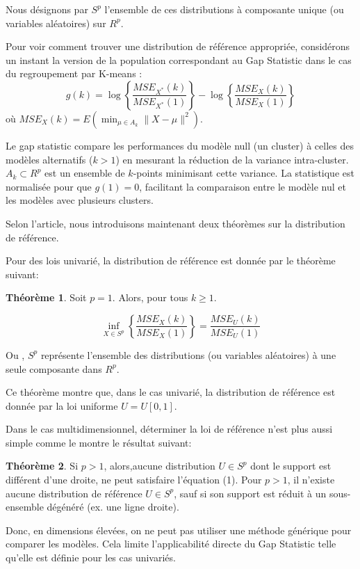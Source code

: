 Nous désignons par $S^{p}$ l'ensemble de ces distributions à composante unique (ou variables aléatoires) sur $R^{p}$.

Pour voir comment trouver une distribution de référence appropriée, considérons un instant la version de la population correspondant au Gap Statistic dans le cas du regroupement par K-means :
$$
g(k)=\log\left\{\frac{MSE_{X^{*}}(k)}{MSE_{X^{*}}(1)}\right\}-\log\left\{\frac{MSE_{X}(k)}{MSE_{X}(1)}\right\}
$$ où $MSE_{X}(k)=E(\min_{\mu\in A_{k}}\|X - \mu\|^{2})$.

Le gap statistic compare les performances du modèle null (un cluster) à celles des modèles alternatifs ($k > 1$) en mesurant la réduction de la variance intra-cluster. $A_{k}\subset R^{p}$ est un ensemble de $k$-points minimisant cette variance. La statistique est normalisée pour que $g(1)=0$, facilitant la comparaison entre le modèle nul et les modèles avec plusieurs clusters.

Selon l'article, nous introduisons maintenant deux théorèmes sur la distribution de référence.

Pour des lois univarié, la distribution de référence est donnée par le théorème suivant:

\textbf{Théorème 1}. Soit \(p = 1\). Alors, pour tous \(k \geq 1\).

\begin{equation}
\inf_{X \in S^p} \left\{ \frac{MSE_{X}(k)}{MSE_{X}(1)} \right\} = \frac{MSE_{U}(k)}{MSE_{U}(1)}
\end{equation}

Ou , \(S^{p}\) représente l'ensemble des distributions (ou variables aléatoires) à une seule composante dans \(R^{p}\).

Ce théorème montre que, dans le cas univarié, la distribution de référence est donnée par la loi uniforme \(U = U[0,1]\). 

Dans le cas multidimensionnel, déterminer la loi de référence n'est plus aussi simple comme le montre le résultat suivant:

\textbf{Théorème 2}. Si \(p > 1\), alors,aucune distribution \(U \in S^{p}\) dont le  support est différent d'une droite, ne peut satisfaire l'équation (1).
Pour $p>1$, il n'existe aucune distribution de référence $U \in S^{p}$, sauf si son support est réduit à un sous-ensemble dégénéré (ex. une ligne droite).

Donc, en dimensions élevées, on ne peut pas utiliser une méthode générique pour comparer les modèles. Cela limite l'applicabilité directe du Gap Statistic telle qu'elle est définie pour les cas univariés.

